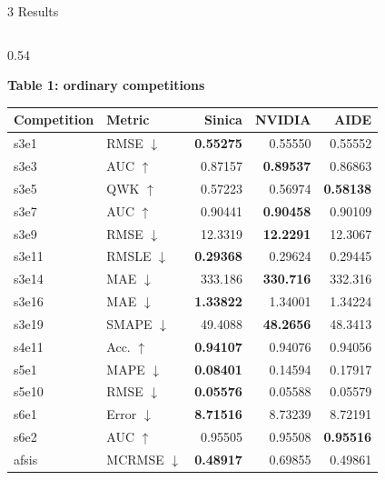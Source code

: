 \documentclass[aspectratio=169,10pt,t]{beamer}
\newcommand{\kb}[1]{\textbf{#1}}
\begin{document}
\begin{frame}{3 Results}
  \vspace{0pt}
  \begin{columns}[t,onlytextwidth]
  \begin{column}{0.54\textwidth}
    {\footnotesize\kb{Table 1: ordinary competitions}\par}
    \vspace{1.2mm}
    {\fontsize{6.8}{7.85}\selectfont
     \setlength{\tabcolsep}{1.1mm}%
     \renewcommand{\arraystretch}{1.0}%
     \begin{tabular}{@{}llrrr@{}}
     \toprule
     \textbf{Competition} & \textbf{Metric} & \textbf{Sinica} & \textbf{NVIDIA}
       & \textbf{AIDE}\\
     \midrule
     s3e1 & RMSE $\downarrow$ & \textbf{0.55275} & 0.55550 & 0.55552\\
     s3e3 & AUC $\uparrow$ & 0.87157 & \textbf{0.89537} & 0.86863\\
     s3e5 & QWK $\uparrow$ & 0.57223 & 0.56974 & \textbf{0.58138}\\
     s3e7 & AUC $\uparrow$ & 0.90441 & \textbf{0.90458} & 0.90109\\
     s3e9 & RMSE $\downarrow$ & 12.3319 & \textbf{12.2291} & 12.3067\\
     s3e11 & RMSLE $\downarrow$ & \textbf{0.29368} & 0.29624 & 0.29445\\
     s3e14 & MAE $\downarrow$ & 333.186 & \textbf{330.716} & 332.316\\
     s3e16 & MAE $\downarrow$ & \textbf{1.33822} & 1.34001 & 1.34224\\
     s3e19 & SMAPE $\downarrow$ & 49.4088 & \textbf{48.2656} & 48.3413\\
     s4e11 & Acc. $\uparrow$ & \textbf{0.94107} & 0.94076 & 0.94056\\
     s5e1 & MAPE $\downarrow$ & \textbf{0.08401} & 0.14594 & 0.17917\\
     s5e10 & RMSE $\downarrow$ & \textbf{0.05576} & 0.05588 & 0.05579\\
     s6e1 & Error $\downarrow$ & \textbf{8.71516} & 8.73239 & 8.72191\\
     s6e2 & AUC $\uparrow$ & 0.95505 & 0.95508 & \textbf{0.95516}\\
     afsis & MCRMSE $\downarrow$ & \textbf{0.48917} & 0.69855 & 0.49861\\

\end{tabular}}
\end{column}
\end{columns}
\end{frame}
\end{document}
